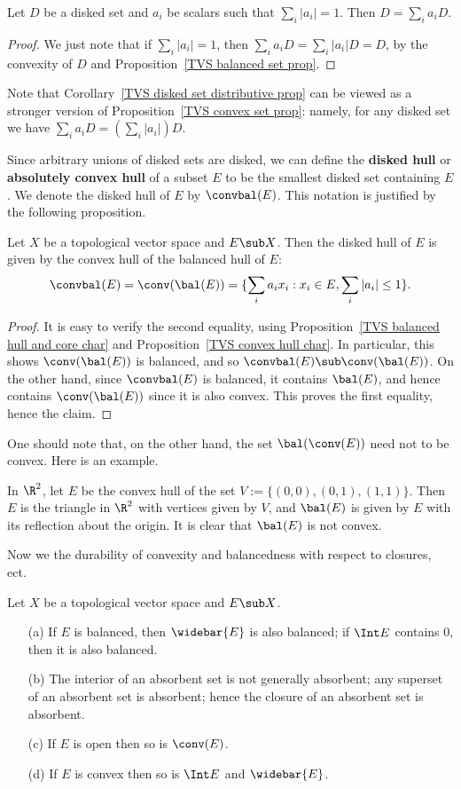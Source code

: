 \begin{corollary}\label{TVS disked set distributive prop}
Let $D$ be a disked set and $a_i$ be scalars such that $\sum_i|a_i|=1$. Then $D=\sum_ia_iD$.
\end{corollary}
\begin{proof}
We just note that if $\sum_i|a_i|=1$, then $\sum_ia_iD=\sum_i|a_i|D=D$, by the convexity of $D$ and Proposition~\ref{TVS balanced set prop}.
\end{proof}
Note that Corollary~\ref{TVS disked set distributive prop} can be viewed as a stronger version of Proposition~\ref{TVS convex set prop}: namely, for any disked set we have $\sum_ia_iD=(\sum_{i}|a_i|)D$.\par
Since arbitrary unions of disked sets are disked, we can define the \textbf{disked hull} or \textbf{absolutely convex hull} of a subset $E$ to be the smallest disked set containing $E$. We denote the disked hull of $E$ by $\convbal(E)$. This notation is justified by the following proposition.
\begin{proposition}\label{TVS disked hull char}
Let $X$ be a topological vector space and $E\sub X$. Then the disked hull of $E$ is given by the convex hull of the balanced hull of $E$:
\[\convbal(E)=\conv(\bal(E))=\{\sum_ia_ix_i:x_i\in E,\sum_i|a_i|\leq 1\}.\]
\end{proposition}
\begin{proof}
It is easy to verify the second equality, using Proposition~\ref{TVS balanced hull and core char} and Proposition~\ref{TVS convex hull char}. In particular, this shows $\conv(\bal(E))$ is balanced, and so $\convbal(E)\sub\conv(\bal(E))$. On the other hand, since $\convbal(E)$ is balanced, it contains $\bal(E)$, and hence contains $\conv(\bal(E))$ since it is also convex. This proves the first equality, hence the claim.
\end{proof}
One should note that, on the other hand, the set $\bal(\conv(E))$ need not to be convex. Here is an example.
\begin{example}
In $\R^2$, let $E$ be the convex hull of the set $V:=\{(0,0),(0,1),(1,1)\}$. Then $E$ is the triangle in $\R^2$ with vertices given by $V$, and $\bal(E)$ is given by $E$ with its reflection about the origin. It is clear that $\bal(E)$ is not convex.
\end{example}
Now we the durability of convexity and balancedness with respect to closures, ect.
\begin{theorem}\label{TVS bal conv absor int and closure}
Let $X$ be a topological vector space and $E\sub X$.
\begin{itemize}
\item[(a)] If $E$ is balanced, then $\widebar{E}$ is also balanced; if $\Int E$ contains $0$, then it is also balanced.
\item[(b)] The interior of an absorbent set is not generally absorbent; any superset of an absorbent set is absorbent; hence the closure of an absorbent set is absorbent.
\item[(c)] If $E$ is open then so is $\conv(E)$.
\item[(d)] If $E$ is convex then so is $\Int E$ and $\widebar{E}$.   
\end{itemize}
\end{theorem}
